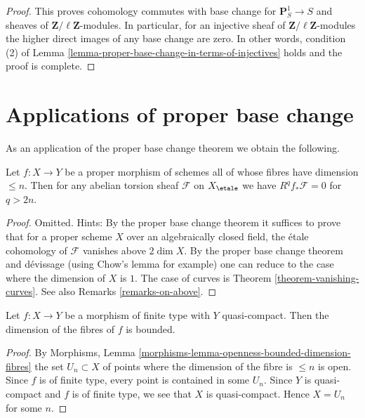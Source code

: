 \begin{proof}
\medskip\noindent
This proves cohomology commutes with base change for
$\mathbf{P}^1_S \to S$ and sheaves of $\mathbf{Z}/\ell\mathbf{Z}$-modules.
In particular, for an injective sheaf of $\mathbf{Z}/\ell\mathbf{Z}$-modules
the higher direct images of any base change are zero.
In other words, condition (2) of
Lemma \ref{lemma-proper-base-change-in-terms-of-injectives}
holds and the proof is complete.
\end{proof}



\section{Applications of proper base change}
\label{section-applications-proper-base-change}

\noindent
As an application of the proper base change theorem we obtain the following.

\begin{lemma}
\label{lemma-cohomological-dimension-proper}
Let $f : X \to Y$ be a proper morphism of schemes
all of whose fibres have dimension $\leq n$.
Then for any abelian torsion sheaf $\mathcal{F}$ on $X_\etale$
we have $R^qf_*\mathcal{F} = 0$ for $q > 2n$.
\end{lemma}

\begin{proof}
Omitted. Hints: By the proper base change theorem it suffices to
prove that for a proper scheme $X$ over an algebraically closed
field, the \'etale cohomology of $\mathcal{F}$ vanishes
above $2\dim X$. By the proper base change theorem and d\'evissage
(using Chow's lemma for example)
one can reduce to the case where the dimension of $X$ is $1$.
The case of curves is Theorem \ref{theorem-vanishing-curves}.
See also Remarks \ref{remarks-on-above}.
\end{proof}

\begin{lemma}
\label{lemma-morphism-finite-type-bounded-dimension}
Let $f : X \to Y$ be a morphism of finite type with $Y$ quasi-compact.
Then the dimension of the fibres of $f$ is bounded.
\end{lemma}

\begin{proof}
By Morphisms, Lemma \ref{morphisms-lemma-openness-bounded-dimension-fibres}
the set $U_n \subset X$ of points where the dimension of the fibre
is $\leq n$ is open. Since $f$ is of finite type, every point is
contained in some $U_n$. Since $Y$ is quasi-compact and $f$ is of
finite type, we see that $X$ is quasi-compact. Hence $X = U_n$ for
some $n$.
\end{proof}








